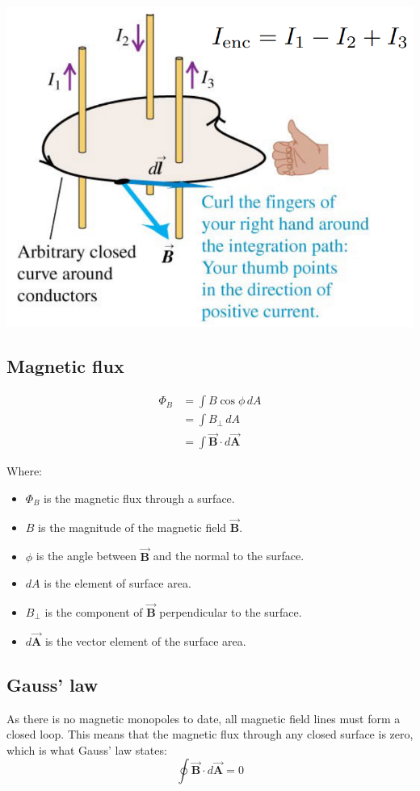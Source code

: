 \documentclass[11pt]{article}
\begin{document}
\begin{center}
\includegraphics[scale=0.65]{./images/amperes-law.png}
\end{center}

\subsection{Magnetic flux}
\label{sec:org3e3af81}
\begin{align*}
\Phi_B &= \int B \cos \phi \, dA \\
&= \int B_{\perp} \, dA \\
&= \int \vec{\boldsymbol{B}} \cdot d \vec{\boldsymbol{A}}
\end{align*}

Where:
\begin{itemize}
\item \(\Phi_B\) is the magnetic flux through a surface.
\item \(B\) is the magnitude of the magnetic field \(\vec{\boldsymbol{B}}\).
\item \(\phi\) is the angle between \(\vec{\boldsymbol{B}}\) and the normal to the surface.
\item \(dA\) is the element of surface area.
\item \(B_{\perp}\) is the component of \(\vec{\boldsymbol{B}}\) perpendicular to the surface.
\item \(d \vec{\boldsymbol{A}}\) is the vector element of the surface area.
\end{itemize}

\subsection{Gauss' law}
\label{sec:org75d04a9}
As there is no magnetic monopoles to date, all magnetic field lines must form a closed loop. This means that the magnetic flux through any closed surface is zero, which is what Gauss' law states:
\[\oint \vec{\boldsymbol{B}} \cdot d \vec{\boldsymbol{A}} = 0\]
\end{document}
